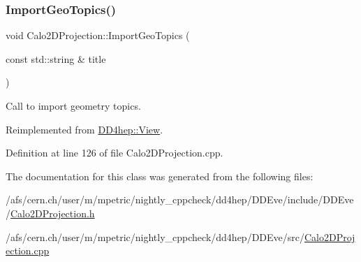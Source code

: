\hypertarget{class_d_d4hep_1_1_calo2_d_projection_af922fcd5265dc3bdbab79ce228cbc6aa}{}\label{class_d_d4hep_1_1_calo2_d_projection_af922fcd5265dc3bdbab79ce228cbc6aa} 
\subsubsection{\texorpdfstring{Import\+Geo\+Topics()}{ImportGeoTopics()}}
{\footnotesize\ttfamily void Calo2\+D\+Projection\+::\+Import\+Geo\+Topics (\begin{DoxyParamCaption}\item[{const std\+::string \&}]{title }\end{DoxyParamCaption})\hspace{0.3cm}{\ttfamily [virtual]}}



Call to import geometry topics. 



Reimplemented from \hyperlink{class_d_d4hep_1_1_view_abd144de401f8a410789c497f44161330}{D\+D4hep\+::\+View}.



Definition at line 126 of file Calo2\+D\+Projection.\+cpp.



The documentation for this class was generated from the following files\+:\begin{DoxyCompactItemize}
\item 
/afs/cern.\+ch/user/m/mpetric/nightly\+\_\+cppcheck/dd4hep/\+D\+D\+Eve/include/\+D\+D\+Eve/\hyperlink{_calo2_d_projection_8h}{Calo2\+D\+Projection.\+h}\item 
/afs/cern.\+ch/user/m/mpetric/nightly\+\_\+cppcheck/dd4hep/\+D\+D\+Eve/src/\hyperlink{_calo2_d_projection_8cpp}{Calo2\+D\+Projection.\+cpp}\end{DoxyCompactItemize}
